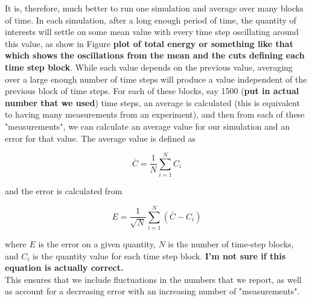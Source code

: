 \documentclass{article}
\begin{document}
\begin{multicols}{2}
It is, therefore, much better to run one simulation and average over many blocks of time.  In each simulation, after a long enough period of time, the quantity of interests will settle on some mean value with every time step oscillating around this value, as show in Figure \textbf{plot of total energy or something like that which shows the oscillations from the mean and the cuts defining each time step block}.  While each value depends on the previous value, averaging over a large enough number of time steps will produce a value independent of the previous block of time steps.  For each of these blocks, say 1500 (\textbf{put in actual number that we used}) time steps, an average is calculated (this is equivalent to having many measurements from an experiment), and then from each of these "measurements", we can calculate an average value for our simulation and an error for that value.  The average value is defined as 

\begin{equation}
\bar{C} = \frac{1}{N}\sum \limits _{i=1}^N C_i 
\end{equation}

\noindent and the error is calculated from 

\begin{equation}
E = \frac{1}{\sqrt{N}}\sum \limits _{i=1}^N (\bar{C} - C_{i})
\end{equation}

\noindent where $E$ is the error on a given quantity, $N$ is the number of time-step blocks, and $C_i$ is the quantity value for each time step block.  \textbf{I'm not sure if this equation is actually correct.}\\

This ensures that we include fluctuations in the numbers that we report, as well as account for a decreasing error with an increasing number of "measurements".  

\end{multicols}
\end{document}
